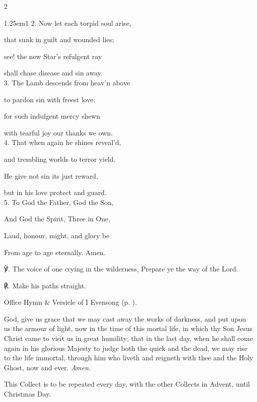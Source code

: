 \begin{paracol}{2}
\begin{hangparas}{1.25em}{1}
2. Now let each torpid soul arise,

that sunk in guilt and wounded lies;

see! the new Star's refulgent ray

shall chase disease and sin away.\\

3. The Lamb descends from heav'n above

to pardon sin with freest love:

for such indulgent mercy shewn

with tearful joy our thanks we own.\\

4. That when again he shines reveal'd,

and trembling worlds to terror yield.

He give not sin its just reward,

but in his love protect and guard.\\

5. To God the Father, God the Son,

And God the Spirit, Three in One,

Laud, honour, might, and glory be

From age to age eternally. Amen.\\
\end{hangparas}

℣. The voice of one crying in the wilderness, Prepare ye the way of the Lord.

℟. Make his paths straight.


\fussy
\end{paracol}

\secondEvensong

\begin{rubric}
	Office Hymn \& Versicle of I Evensong (p. \pageref{FirstAdventEvensongHymn}).
\end{rubric}



\collect\label{AdventICollect}
 God, give us grace that we may cast away the works of darkness, and put upon us the armour of light, now in the time of this mortal life, in which thy Son Jesus Christ came to visit us in great humility; that in the last day, when he shall come again in his glorious Majesty to judge both the quick and the dead, we may rise to the life immortal, through him who liveth and reigneth with thee and the Holy Ghost, now and ever. \textit{Amen.}
\begin{rubric}
    This Collect is to be repeated every day, with the other Collects in Advent, until Christmas Day.
\end{rubric}

